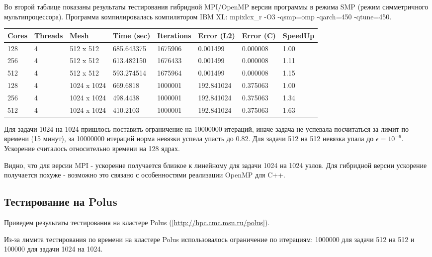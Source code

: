 \documentclass[12pt]{article}
\begin{document}
Во второй таблице показаны результаты тестирования гибридной MPI/OpenMP версии программы в режима SMP (режим симметричного мультипроцессора).
Программа компилировалась компилятором IBM XL: mpixlcx\_r -O3 -qsmp=omp -qarch=450 -qtune=450.
\begin{center}
\begin{tabular}{llllllll}
Cores & Threads & Mesh & Time (sec) & Iterations & Error (L2) & Error (C) & SpeedUp \\
\hline
128 & 4 & 512 x 512 & 685.643375 & 1675906 & 0.001499 & 0.000008 & 1.00 \\
256 & 4 & 512 x 512 & 613.482150 & 1676433 & 0.001499 & 0.000008 & 1.11 \\
512 & 4 & 512 x 512 & 593.274514 & 1675964 & 0.001499 & 0.000008 & 1.15 \\
\hline
128 & 4 & 1024 x 1024 & 669.6818 & 1000001 & 192.841024 & 0.375063 & 1.00 \\
256 & 4 & 1024 x 1024 & 498.4438 & 1000001 & 192.841024 & 0.375063 & 1.34 \\
512 & 4 & 1024 x 1024 & 410.2103 & 1000001 & 192.841024 & 0.375063 & 1.63 \\
\hline
\end{tabular}
\end{center}
Для задачи 1024 на 1024 пришлось поставить ограничение на 10000000 итераций,
иначе задача не успевала посчитаться за лимит по времени (15 минут), за 10000000 итераций
норма невязки успела упасть до 0.82. Для задачи 512 на 512 невязка упала до $\epsilon = 10^{-6}$.
Ускорение считалось относительно времени на 128 ядрах. 

Видно, что для версии MPI - ускорение получается близкое к линейному для задачи 1024 на 1024 узлов. 
Для гибридной версии ускорение получается похуже - возможно это связано с особенностями реализации OpenMP для C++. 

\newpage

\subsection{Тестирование на Polus}

Приведем результаты тестирования на кластере Polus (\ref{http://hpc.cmc.msu.ru/polus}). 

Из-за лимита тестирования по времени на кластере Polus использовалось ограничение по итерациям: 1000000 для задачи 512 на 512 и 100000 для задачи 1024 на 1024.
\end{document}
